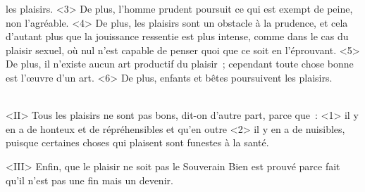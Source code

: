 \documentclass[french,twoside]{book} %
\begin{document}
les plaisirs. <3> De plus, l’homme prudent poursuit ce qui est exempt de peine, non l’agréable. <4> De plus, les plaisirs sont un obstacle à la prudence, et cela d’autant plus que la jouissance ressentie est plus intense, comme dans le cas du plaisir sexuel, où nul n’est capable de penser quoi que ce soit en l’éprouvant. <5> De plus, il n’existe aucun art productif du plaisir ; cependant toute chose bonne est l’œuvre d’un art. <6> De plus, enfants et bêtes poursuivent les plaisirs.\par
\\
<II> Tous les plaisirs ne sont pas bons, dit-on d’autre part, parce que : <1> il y en a de honteux et de répréhensibles et qu’en outre <2> il y en a de nuisibles, puisque certaines choses qui plaisent sont funestes à la santé.\par
<III> Enfin, que le plaisir ne soit pas le Souverain Bien est prouvé parce fait qu’il n’est pas une fin mais un devenir.
\end{document}
